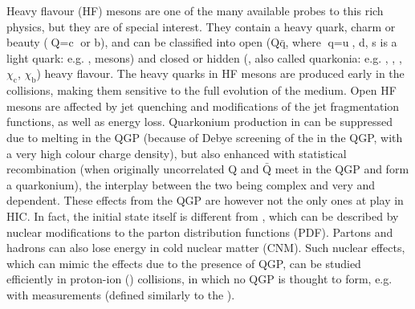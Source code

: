 \documentclass[a4paper,11pt]{article}
\begin{document}
Heavy flavour (HF) mesons are one of the many available probes to this rich physics, but they are of special interest. They contain a heavy quark, charm or beauty ($\textrm{Q} = \textrm{c}$ or b), and can be classified into open ($\textrm{Q}\bar{\textrm{q}}$, where $\textrm{q} = \textrm{u}$, d, s is a light quark: e.g. \D, \B mesons) and closed or hidden (\QQbar, also called 
quarkonia: e.g. \Jpsi, \psiP,  \PgUabc, $\chi_{\textrm{c}}$, $\chi_{\textrm{b}}$) heavy flavour.
The heavy quarks in HF mesons are produced early in the collisions, making them sensitive to the full evolution of the medium. Open HF mesons are affected by jet quenching and modifications of the jet fragmentation functions, as well as energy loss. Quarkonium production in \AAA can be suppressed due to melting in the QGP (because of Debye screening of the \QQbar in the QGP, with a very high colour charge density), but also enhanced with statistical recombination (when originally uncorrelated Q and $\bar{\textrm{Q}}$ meet in the QGP and form a quarkonium), the interplay between the two being complex and very \pt and \sqrtsnn dependent.
%
These effects from the QGP are however not the only ones at play in HIC. In fact, the initial state itself is different from \pp, which can be described by nuclear modifications to the parton distribution functions (PDF). Partons and hadrons can also lose energy in cold nuclear matter (CNM). Such nuclear effects, which can mimic the effects due to the presence of QGP, can be studied efficiently in proton-ion (\pA) collisions, in which no QGP is thought to form, e.g. with \rpa measurements (defined similarly to the \raa).
\end{document}
